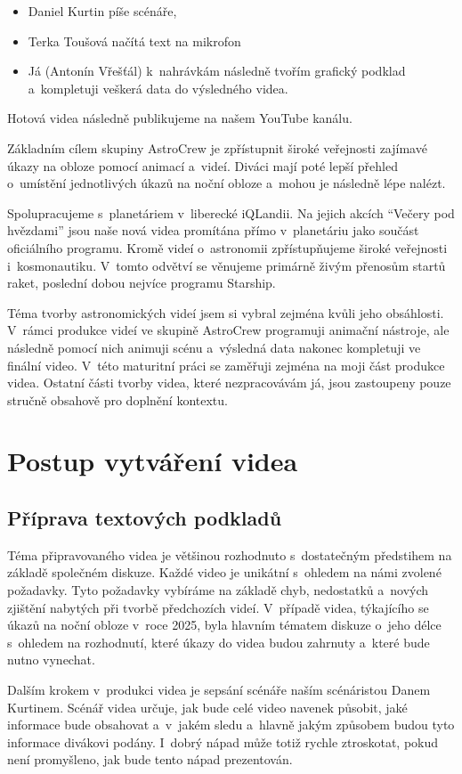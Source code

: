 \documentclass[12pt,a4paper,titlepage]{article}
\begin{document}
\begin{itemize}
	\item Daniel Kurtin píše scénáře,
	\item Terka Toušová načítá text na mikrofon
	\item Já (Antonín Vřešťál) k~nahrávkám následně tvořím grafický podklad a~kompletuji veškerá data do výsledného videa.
\end{itemize}
Hotová videa následně publikujeme na našem YouTube kanálu. 

Základním cílem skupiny AstroCrew je zpřístupnit široké veřejnosti zajímavé úkazy na obloze pomocí animací a~videí. Diváci mají poté lepší přehled o~umístění jednotlivých úkazů na noční obloze a~mohou je následně lépe nalézt.

Spolupracujeme s~planetáriem v~liberecké iQLandii. Na jejich akcích \enquote{Večery pod hvězdami} jsou naše nová videa promítána přímo v~planetáriu jako součást oficiálního programu. Kromě videí o~astronomii zpřístupňujeme široké veřejnosti i~kosmonautiku. V~tomto odvětví se věnujeme primárně živým přenosům startů raket, poslední dobou nejvíce programu Starship.

Téma tvorby astronomických videí jsem si vybral zejména kvůli jeho obsáhlosti. V~rámci produkce videí ve skupině AstroCrew programuji animační nástroje, ale následně pomocí nich animuji scénu a~výsledná data nakonec kompletuji ve finální video. V~této maturitní práci se zaměřuji zejména na moji část produkce videa. Ostatní části tvorby videa, které nezpracovávám já, jsou zastoupeny pouze stručně obsahově pro doplnění kontextu. 
\section{Postup vytváření videa}\label{makingof}
\subsection{Příprava textových podkladů}\label{makingof:text-prep}
Téma připravovaného videa je většinou rozhodnuto s~dostatečným předstihem na základě společném diskuze. Každé video je unikátní s~ohledem na námi zvolené požadavky. Tyto požadavky vybíráme na základě chyb, nedostatků a~nových zjištění nabytých při tvorbě předchozích videí. V~případě videa, týkajícího se úkazů na noční obloze v~roce 2025, byla hlavním tématem diskuze o~jeho délce s~ohledem na rozhodnutí, které úkazy do videa budou zahrnuty a~které bude nutno vynechat.

Dalším krokem v~produkci videa je sepsání scénáře naším scénáristou Danem Kurtinem. Scénář videa určuje, jak bude celé video navenek působit, jaké informace bude obsahovat a~v~jakém sledu a~hlavně jakým způsobem budou tyto informace divákovi podány. I~dobrý nápad může totiž rychle ztroskotat, pokud není promyšleno, jak bude tento nápad prezentován.
\end{document}
